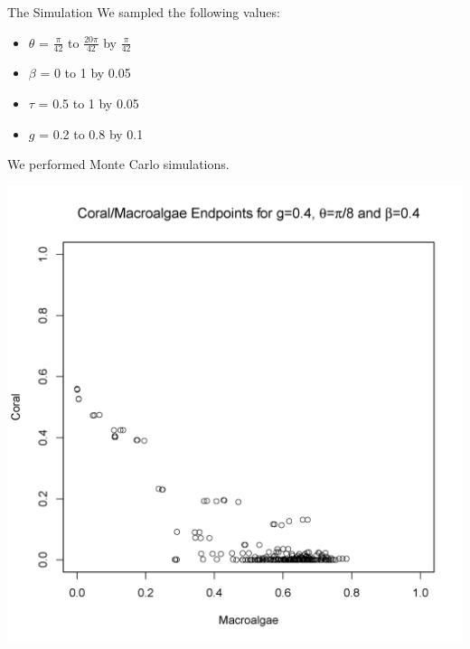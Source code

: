 \begin{frame}{The Simulation}
We sampled the following values:
\begin{itemize}
\item $\theta$ = $\frac{\pi}{42}$ to $\frac{20\pi}{42}$ by $\frac{\pi}{42}$\\
\item $\beta$ = 0 to 1 by 0.05\\
\item $\tau$ = 0.5 to 1 by 0.05\\
\item $g$ = 0.2 to 0.8 by 0.1\\
\end{itemize}
We performed Monte Carlo simulations.
\end{frame}


\begin{frame}
\includegraphics[scale=.325]{scatter_lgcoral_gpt4_betapt4_theta10.png}
\end{frame}

